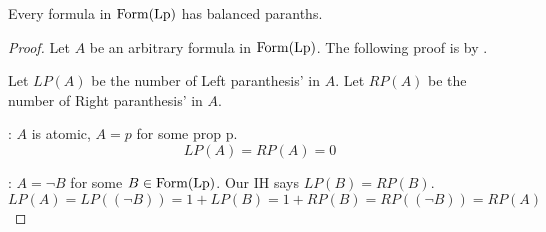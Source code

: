 \documentclass[12pt]{article}
\begin{document}
\bbox
\begin{lem}\label{lem:balance_parans_in_lp}
  Every formula in \(\mathrm{Form}(\mathrm{Lp})\) has balanced paranths.
\end{lem}
\ebox
\bboxproof
\begin{proof}
  Let \(A\) be an arbitrary formula in \(\mathrm{Form}(\mathrm{Lp})\). The following
  proof is by .

  Let \(LP(A)\) be the number of Left paranthesis' in \(A\). Let \(RP(A)\) be 
  the number of Right paranthesis' in \(A\).

  : \(A\) is atomic, \(A=p\) for some prop p.
  \[LP(A)=RP(A)=0\]

  : \(A=\neg B\) for some \(B\in\mathrm{Form}(\mathrm{Lp})\).
  Our IH says \(LP(B)=RP(B)\).
  \[LP(A)=LP((\neg B))=1 + LP(B)=1+RP(B)=RP((\neg B))=RP(A)\]
\end{proof}
\ebox


\end{document}
